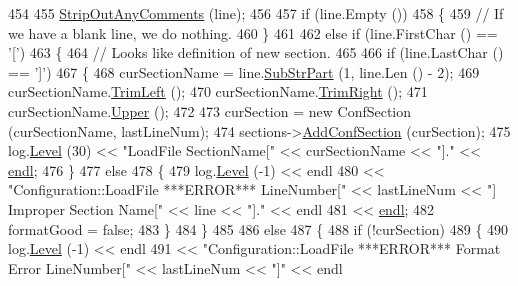 \begin{DoxyCode}
454     
455     \hyperlink{_configuration_8cpp_a65029dc58121c93c0ecd83d9809d077a}{StripOutAnyComments} (line);
456 
457     \textcolor{keywordflow}{if}  (line.Empty ())            
458     \{
459       \textcolor{comment}{// If we have a blank line, we do nothing.}
460     \}
461 
462     \textcolor{keywordflow}{else} \textcolor{keywordflow}{if}  (line.FirstChar () == \textcolor{charliteral}{'['})
463     \{
464       \textcolor{comment}{// Looks like definition of new section. }
465 
466       \textcolor{keywordflow}{if}  (line.LastChar () == \textcolor{charliteral}{']'})
467       \{
468         curSectionName = line.\hyperlink{class_k_k_b_1_1_k_k_str_a5f20b2ddfc9f07c8ef99592810332ddb}{SubStrPart} (1, line.Len () - 2);
469         curSectionName.\hyperlink{class_k_k_b_1_1_k_k_str_af7c102c53103ddff3f48270b4a198c89}{TrimLeft} ();
470         curSectionName.\hyperlink{class_k_k_b_1_1_k_k_str_aa912161f17871e2d6fec7bbac033221c}{TrimRight} ();
471         curSectionName.\hyperlink{class_k_k_b_1_1_k_k_str_a66ea0feabc94da88591b56a683695bd9}{Upper} ();
472 
473         curSection = \textcolor{keyword}{new} ConfSection (curSectionName, lastLineNum);
474         sections->\hyperlink{class_k_k_b_1_1_configuration_1_1_conf_section_list_a4cb1a372299d3e5b6c306644bb465fd6}{AddConfSection} (curSection);
475         log.\hyperlink{class_k_k_b_1_1_run_log_a32cf761d7f2e747465fd80533fdbb659}{Level} (30) << \textcolor{stringliteral}{"LoadFile   SectionName["} << curSectionName << \textcolor{stringliteral}{"]."} << 
      \hyperlink{namespace_k_k_b_ad1f50f65af6adc8fa9e6f62d007818a8}{endl};
476       \}
477       \textcolor{keywordflow}{else}
478       \{
479         log.\hyperlink{class_k_k_b_1_1_run_log_a32cf761d7f2e747465fd80533fdbb659}{Level} (-1) << endl
480                        << \textcolor{stringliteral}{"Configuration::LoadFile   ***ERROR***    LineNumber["} << lastLineNum << \textcolor{stringliteral}{"] 
       Improper Section Name["} << line << \textcolor{stringliteral}{"]."} << endl
481                        << \hyperlink{namespace_k_k_b_ad1f50f65af6adc8fa9e6f62d007818a8}{endl};
482         formatGood = \textcolor{keyword}{false};
483       \}
484     \}
485 
486     \textcolor{keywordflow}{else}
487     \{
488       \textcolor{keywordflow}{if}  (!curSection)
489       \{
490         log.\hyperlink{class_k_k_b_1_1_run_log_a32cf761d7f2e747465fd80533fdbb659}{Level} (-1) << endl
491                        << \textcolor{stringliteral}{"Configuration::LoadFile   ***ERROR***  Format Error LineNumber["} << lastLineNum 
      << \textcolor{stringliteral}{"]"} << endl

\end{DoxyCode}
